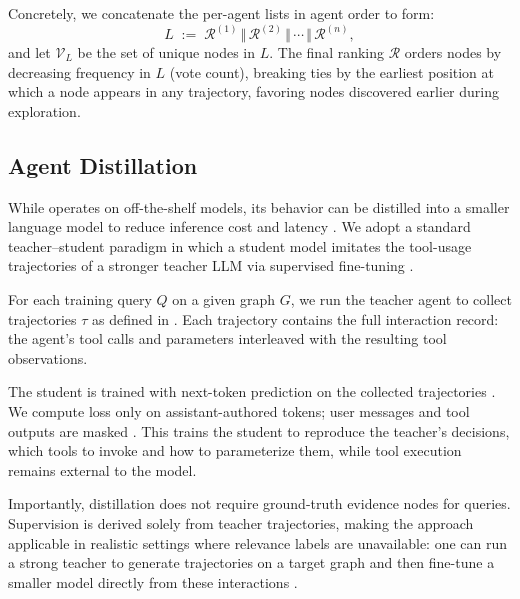 Concretely, we concatenate the per-agent lists in agent order to form:
\begin{equation*}
    L \;:=\; \mathcal{R}^{(1)} \,\Vert\, \mathcal{R}^{(2)} \,\Vert\, \cdots \,\Vert\, \mathcal{R}^{(n)},
\end{equation*}
and let $\mathcal{V}_L$ be the set of unique nodes in $L$. The final ranking $\mathcal{R}$ orders nodes by decreasing frequency in $L$ (vote count), breaking ties by the earliest position at which a node appears in any trajectory, favoring nodes discovered earlier during exploration.

\subsection{Agent Distillation}
\label{subsec:distill}
While \retrieverShort operates on off-the-shelf models, its behavior can be distilled into a smaller language model to reduce inference cost and latency \cite{hinton_distilling_2015}. We adopt a standard teacher--student paradigm in which a student model imitates the tool-usage trajectories of a stronger teacher LLM via supervised fine-tuning \cite{schick_toolformer_2023}.

For each training query $Q$ on a given graph $G$, we run the teacher agent to collect trajectories $\tau$ as defined in . Each trajectory contains the full interaction record: the agent's tool calls and parameters interleaved with the resulting tool observations.

The student is trained with next-token prediction on the collected trajectories \cite{ouyang_training_2022}. We compute loss only on assistant-authored tokens; user messages and tool outputs are masked \cite{huerta-enochian_instruction_2024,shi_instruction_2024}. This trains the student to reproduce the teacher's decisions, which tools to invoke and how to parameterize them, while tool execution remains external to the model. 

Importantly, distillation does not require ground-truth evidence nodes for queries. Supervision is derived solely from teacher trajectories, making the approach applicable in realistic settings where relevance labels are unavailable: one can run a strong teacher to generate trajectories on a target graph and then fine-tune a smaller model directly from these interactions \cite{schick_toolformer_2023,kang_distilling_2025}.